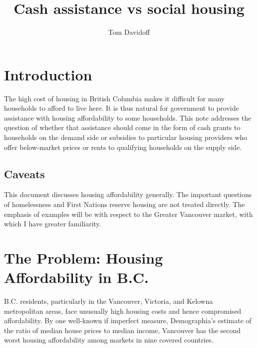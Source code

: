 \documentclass[12pt]{article}
\begin{document}
\title{Cash assistance vs social housing}
\author{Tom Davidoff}
\maketitle

\section{Introduction}

The high cost of housing in British Columbia makes it difficult for many households to afford to live here. It is thus natural for government to provide assistance with housing affordability to some households. This note addresses the question of whether that assistance should come in the form of cash grants to households on the demand side or subsidies to particular housing providers who offer below-market prices or rents to qualifying households on the supply side. 


\subsection{Caveats}

This document discusses housing affordability generally. The important questions of homelessness and First Nations reserve housing are not treated directly. The emphasis of examples will be with respect to the Greater Vancouver market, with which I have greater familiarity.

\section{The Problem: Housing Affordability in B.C.}

B.C. residents, particularly in the Vancouver, Victoria, and Kelowna metropolitan areas, face unusually high housing costs and hence compromised affordability. By one well-known if imperfect measure, Demographia's estimate of the ratio of median house prices to median income, Vancouver has the second worst housing affordability among markets in nine covered countries. 
\end{document}

